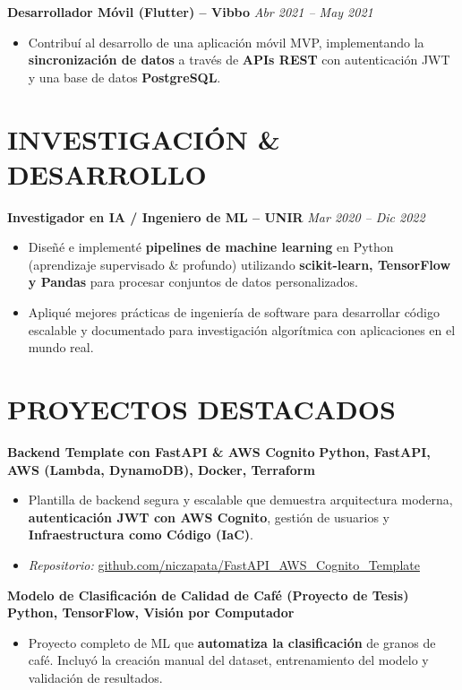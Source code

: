 \documentclass[11pt, a4paper]{article}
\begin{document}
\textbf{Desarrollador Móvil (Flutter) – Vibbo} \hfill \textit{Abr 2021 – May 2021}
\begin{itemize}[leftmargin=*, nosep, topsep=4pt]
	\item Contribuí al desarrollo de una aplicación móvil MVP, implementando la \textbf{sincronización de datos} a través de \textbf{APIs REST} con autenticación JWT y una base de datos \textbf{PostgreSQL}.
\end{itemize}

\section*{INVESTIGACIÓN \& DESARROLLO}
\textbf{Investigador en IA / Ingeniero de ML – UNIR} \hfill \textit{Mar 2020 – Dic 2022}
\begin{itemize}[leftmargin=*, nosep, topsep=4pt]
	\item Diseñé e implementé \textbf{pipelines de machine learning} en Python (aprendizaje supervisado \& profundo) utilizando \textbf{scikit-learn, TensorFlow y Pandas} para procesar conjuntos de datos personalizados.
	\item Apliqué mejores prácticas de ingeniería de software para desarrollar código escalable y documentado para investigación algorítmica con aplicaciones en el mundo real.
\end{itemize}

\section*{PROYECTOS DESTACADOS}
\textbf{Backend Template con FastAPI \& AWS Cognito} \hfill \textbf{Python, FastAPI, AWS (Lambda, DynamoDB), Docker, Terraform}
\begin{itemize}[leftmargin=*, nosep, topsep=4pt]
	\item Plantilla de backend segura y escalable que demuestra arquitectura moderna, \textbf{autenticación JWT con AWS Cognito}, gestión de usuarios y \textbf{Infraestructura como Código (IaC)}.
	\item \textit{Repositorio:} \href{https://github.com/niczapata/FastAPI\_AWS\_Cognito\_Template}{github.com/niczapata/FastAPI\_AWS\_Cognito\_Template}
\end{itemize}

\textbf{Modelo de Clasificación de Calidad de Café (Proyecto de Tesis)} \hfill \textbf{Python, TensorFlow, Visión por Computador}
\begin{itemize}[leftmargin=*, nosep, topsep=4pt]
	\item Proyecto completo de ML que \textbf{automatiza la clasificación} de granos de café. Incluyó la creación manual del dataset, entrenamiento del modelo y validación de resultados.
\end{itemize}
\end{document}

